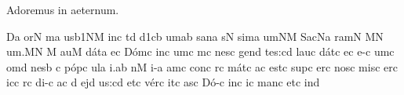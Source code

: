 
\beginhymn Adoremus in aeternum.

\nosolesmescustos
\initiumgregorianum
{}%
\sgn {}{}D\punctum a\egn
\sgn {}or\punctum N\egn
{}m\punctum a\egn
\sgn {}us\episem b1\clivis NM\egn
\spatium
\sgn {}in\punctum c\egn
\spatium
\sgn {}{\ae}t\punctum d\egn
{}\episem d1\clivis cb\egn
\sgn {}um\punctum a\augmentum b\egn
\spatium
\divisiominima
\spatium
\sgn san\punctum a\egn
{}s\punctum N\egn
\sgn sim\punctum a\egn
\sgn {}um\clivis NM\egn
\spatium
\sgn Sac\pes Na\egn
\sgn ram\punctum N\egn
{}\punctum M\augmentum N\egn
\sgn {}u{m.}\punctum M\augmentum N\egn
\spatium
\divisiofinalis
\spatium
\custos M
\lineaproxima
{}au\punctum M\egn
\sgn d{\'a}t\punctum a\egn
\sgn {}e{}\punctum c\egn
\spatium
\sgn D{\'o}m\punctum c\egn
\sgn {}in\punctum c\egn
\sgn {}um\punctum c\egn
\spatium
{}m\punctum c\egn
\sgn nes\punctum c\egn
\spatium
\sgn gen\punctum d\egn
\sgn te{s:}\punctum c\augmentum d\egn
\spatium
\asteriscus
\divisiomaior
\spatium
\sgn lau\punctum c\egn
\sgn d{\'a}t\punctum c\egn
\sgn {}e{}\punctum c\egn
\spatium
\sgn {}e-\punctum c\egn
\sgn {}um\punctum c\egn
\spatium
\sgn {}om\punctum d\egn
\sgn nes\punctum b\egn
\spatium
\custos c
\lineaproxima
\sgn p{\'o}p\punctum c\egn
\sgn {}ul\punctum a\egn
\sgn {}i.\punctum a\augmentum b\egn
\spatium
\divisiofinalis
\spatium
{}n\punctum M\egn
\sgn {}i-\punctum a\egn
\sgn {}am\punctum c\egn
\spatium
\sgn c{o}n\punctum c\egn
{}r\punctum c\egn
\sgn m{\'a}t\punctum c\egn
\sgn {}a{}\punctum c\egn
\spatium
\sgn {}e{st}\punctum c\egn
\spatium
\sgn sup\punctum c\egn
\sgn {}er\punctum c\egn
\spatium
\sgn nos\punctum c\egn
\spatium
\sgn mis\punctum c\egn
\sgn {}er\punctum c\egn
\sgn {}ic\punctum c\egn
{}r\punctum c\egn
\sgn di-\punctum c\egn
\sgn {}a{}\punctum c\egn
\spatium
\custos d
\lineaproxima
\sgn {}ej\punctum d\egn
\sgn {}u{s:}\punctum c\augmentum d\egn
\spatium
\asteriscus
\divisiomaior
\spatium
\sgn {}et\punctum c\egn
\spatium
\sgn v{\'e}r\punctum c\egn
\sgn {}it\punctum c\egn
\sgn {}as\punctum c\egn
\spatium
\sgn D{\'o}-\punctum c\egn
{}in\punctum c\egn
\sgn {}i{}\punctum c\egn
\spatium
\sgn man\punctum c\egn
\sgn {}et\punctum c\egn
\spatium
\sgn {}in\punctum d\egn
